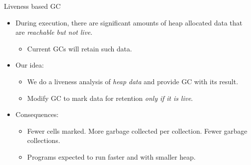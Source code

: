 \begin{frame}{Liveness based GC}
    \begin{itemize}[<+->]\itemsep0.75em
    \item During execution, there are significant amounts of heap allocated data
      that  are {\em  reachable but not live}.
      \begin{itemize}
      \item Current GCs will retain such data.
      \end{itemize}
    \item Our idea: 
      \begin{itemize}
      \item We do  a liveness analysis of {\em heap  data} and provide
        GC with its result.
      \item Modify GC to mark data for retention {\em only if it is live}.
      \end{itemize}
    \item Consequences:
      \begin{itemize}
      \item  Fewer cells  marked.  \pause More  garbage collected  per
        collection. \pause Fewer garbage collections. \pause
      \item Programs expected to run faster and with smaller heap.
      \end{itemize}
    \end{itemize}
\end{frame}

